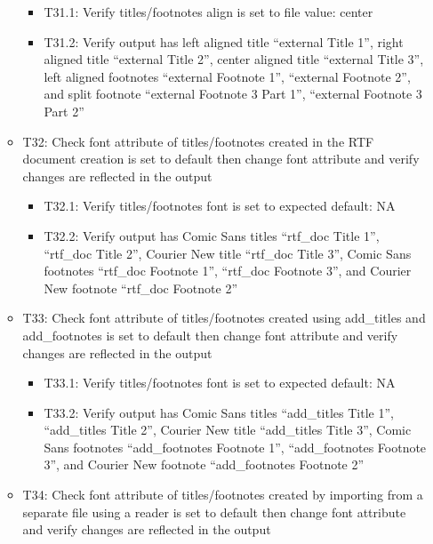 \documentclass[]{article}
\providecommand{\tightlist}{%
  \setlength{\itemsep}{0pt}\setlength{\parskip}{0pt}}
\begin{document}
\begin{itemize}
\begin{itemize}
    \begin{itemize}
    \tightlist
    \item
      T31.1: Verify titles/footnotes align is set to file value: center
    \item
      T31.2: Verify output has left aligned title ``external Title 1'',
      right aligned title ``external Title 2'', center aligned title
      ``external Title 3'', left aligned footnotes ``external Footnote
      1'', ``external Footnote 2'', and split footnote ``external
      Footnote 3 Part 1'', ``external Footnote 3 Part 2''
    \end{itemize}
  \item
    T32: Check font attribute of titles/footnotes created in the RTF
    document creation is set to default then change font attribute and
    verify changes are reflected in the output

    \begin{itemize}
    \tightlist
    \item
      T32.1: Verify titles/footnotes font is set to expected default: NA
    \item
      T32.2: Verify output has Comic Sans titles ``rtf\_doc Title 1'',
      ``rtf\_doc Title 2'', Courier New title ``rtf\_doc Title 3'',
      Comic Sans footnotes ``rtf\_doc Footnote 1'', ``rtf\_doc Footnote
      3'', and Courier New footnote ``rtf\_doc Footnote 2''
    \end{itemize}
  \item
    T33: Check font attribute of titles/footnotes created using
    add\_titles and add\_footnotes is set to default then change font
    attribute and verify changes are reflected in the output

    \begin{itemize}
    \tightlist
    \item
      T33.1: Verify titles/footnotes font is set to expected default: NA
    \item
      T33.2: Verify output has Comic Sans titles ``add\_titles Title
      1'', ``add\_titles Title 2'', Courier New title ``add\_titles
      Title 3'', Comic Sans footnotes ``add\_footnotes Footnote 1'',
      ``add\_footnotes Footnote 3'', and Courier New footnote
      ``add\_footnotes Footnote 2''
    \end{itemize}
  \item
    T34: Check font attribute of titles/footnotes created by importing
    from a separate file using a reader is set to default then change
    font attribute and verify changes are reflected in the output


\end{itemize}
\end{itemize}
\end{document}
